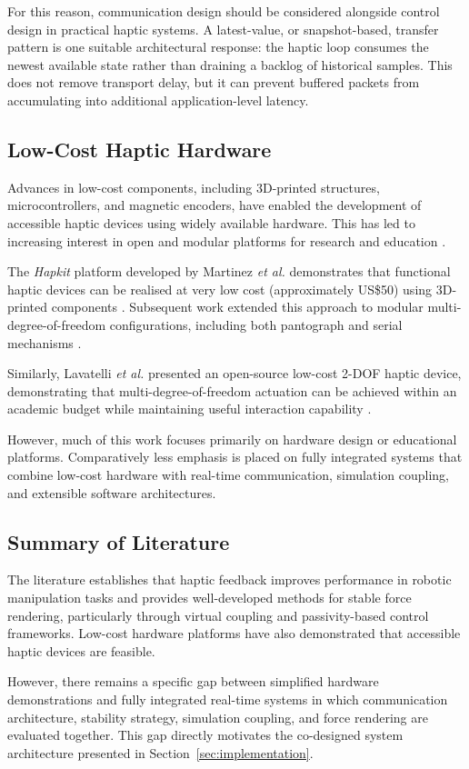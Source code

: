 For this reason, communication design should be considered alongside control design in practical haptic systems. A latest-value, or snapshot-based, transfer pattern is one suitable architectural response: the haptic loop consumes the newest available state rather than draining a backlog of historical samples. This does not remove transport delay, but it can prevent buffered packets from accumulating into additional application-level latency.

\subsection{Low-Cost Haptic Hardware}

Advances in low-cost components, including 3D-printed structures, microcontrollers, and magnetic encoders, have enabled the development of accessible haptic devices using widely available hardware. This has led to increasing interest in open and modular platforms for research and education \cite{giriApplicationBasedReviewHaptics2021}.

The \emph{Hapkit} platform developed by Martinez \emph{et al.} demonstrates that functional haptic devices can be realised at very low cost (approximately US\$50) using 3D-printed components \cite{martinez3DPrintedHaptic2016}. Subsequent work extended this approach to modular multi-degree-of-freedom configurations, including both pantograph and serial mechanisms \cite{martinezOpenSourceModular2017}. 

Similarly, Lavatelli \emph{et al.} presented an open-source low-cost 2-DOF haptic device, demonstrating that multi-degree-of-freedom actuation can be achieved within an academic budget while maintaining useful interaction capability \cite{lavatelliDesignOpenSource2014}.

However, much of this work focuses primarily on hardware design or educational platforms. Comparatively less emphasis is placed on fully integrated systems that combine low-cost hardware with real-time communication, simulation coupling, and extensible software architectures.

\subsection{Summary of Literature}

The literature establishes that haptic feedback improves performance in robotic manipulation tasks and provides well-developed methods for stable force rendering, particularly through virtual coupling and passivity-based control frameworks. Low-cost hardware platforms have also demonstrated that accessible haptic devices are feasible.

However, there remains a specific gap between simplified hardware demonstrations and fully integrated real-time systems in which communication architecture, stability strategy, simulation coupling, and force rendering are evaluated together. This gap directly motivates the co-designed system architecture presented in Section~\ref{sec:implementation}.
